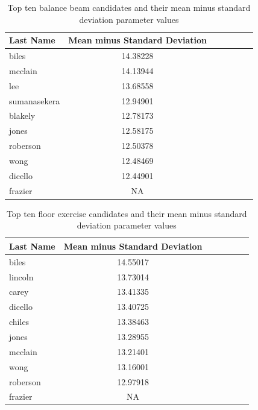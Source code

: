 \documentclass[12pt]{article}
\begin{document}
\begin{table}[tbp]
  \caption{Top ten balance beam candidates and their mean minus standard deviation parameter values}
  \label{tab:tableBBP}
\centering
\begin{tabular}[t]{lccllll}
 \toprule
Last Name & Mean minus Standard Deviation\\
\midrule
biles & 14.38228\\
\midrule
mcclain & 14.13944\\
\midrule
lee & 13.68558\\
\midrule
sumanasekera & 12.94901\\
\midrule
blakely & 12.78173\\
\midrule
jones & 12.58175\\
\midrule
roberson & 12.50378\\
\midrule
wong & 12.48469\\
\midrule
dicello & 12.44901\\
\midrule
frazier & NA\\
\bottomrule
\end{tabular}
\end{table}



\begin{table}[tbp]
  \caption{Top ten floor exercise candidates and their mean minus standard deviation parameter values}
  \label{tab:tableBBP}
\centering
\begin{tabular}[t]{lccllll}
 \toprule
Last Name & Mean minus Standard Deviation\\
\midrule
biles & 14.55017\\
\midrule
lincoln & 13.73014\\
\midrule
carey & 13.41335\\
\midrule
dicello & 13.40725\\
\midrule
chiles & 13.38463\\
\midrule
jones & 13.28955\\
\midrule
mcclain & 13.21401\\
\midrule
wong & 13.16001\\
\midrule
roberson & 12.97918\\
\midrule
frazier & NA\\
\bottomrule
\end{tabular}
\end{table}
\end{document}
